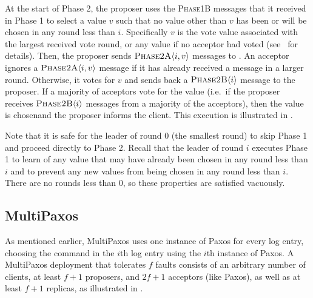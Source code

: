 At the start of Phase 2, the proposer uses the \textsc{Phase1B} messages that
it received in Phase 1 to select a value $v$ such that no value other than $v$
has been or will be chosen in any round less than $i$. Specifically $v$ is the
vote value associated with the largest received vote round, or any value if no
acceptor had voted (see~\cite{lamport2001paxos} for details). Then, the
%
proposer sends $\textsc{Phase2A}\langle{i, v}\rangle$ messages to . An
acceptor ignores a $\textsc{Phase2A}\langle{i, v}\rangle$ message if it has already received a
message in a larger round. Otherwise, it votes for $v$ and sends back a
$\textsc{Phase2B}\langle{i}\rangle$ message to the proposer. If a majority of acceptors vote for the
value (i.e.\ if the proposer receives $\textsc{Phase2B}\langle{i}\rangle$ messages from a
%
majority of the acceptors), then the value is chosenand the proposer informs the
client. This execution is illustrated in .
%

Note that it is safe for the leader of round $0$ (the smallest round) to skip
Phase 1 and proceed directly to Phase 2. Recall that the leader of round $i$
executes Phase 1 to learn of any value that may have already been chosen in any
round less than $i$ and to prevent any new values from being chosen in any
round less than $i$. There are no rounds less than $0$, so these properties are
satisfied vacuously.

\subsection{MultiPaxos}
As mentioned earlier, MultiPaxos uses one instance of Paxos for every log
entry, choosing the command in the $i$th log entry using the $i$th instance of
Paxos.  A MultiPaxos deployment that tolerates $f$ faults consists of an
arbitrary number of clients, at least $f+1$ proposers, and $2f+1$ acceptors
(like Paxos), as well as at least $f+1$ replicas, as illustrated in
.

